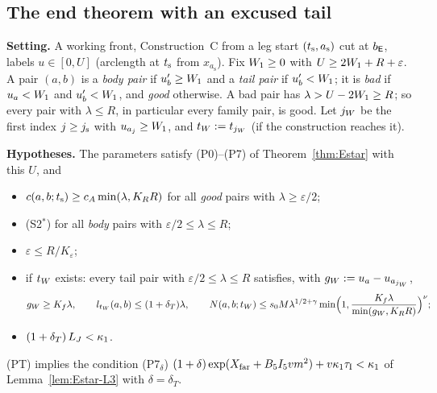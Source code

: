 \subsection{The end theorem with an excused tail}

\noindent\textbf{Setting.} A working front, Construction~C from a leg start $(t_{\mathrm s},a_{\mathrm s})$ cut at $b_{\mathsf E}$, labels
$u\in[0,U]$ (arclength at $t_{\mathrm s}$ from $x_{a_{\mathrm s}}$). Fix $W_1\ge0$ with $U\ge2W_1+R+\varepsilon$. A pair $(a,b)$ is a
\emph{body pair} if $u_b'\ge W_1$ and a \emph{tail pair} if $u_b'<W_1$; it is \emph{bad} if $u_a<W_1$ and $u_b'<W_1$, and
\emph{good} otherwise. A bad pair has $\lambda>U-2W_1\ge R$; so every pair with $\lambda\le R$, in particular every family pair,
is good. Let $j_W$ be the first index $j\ge j_{\mathrm s}$ with $u_{a_j}\ge W_1$, and $t_W:=t_{j_W}$ (if the construction reaches it).

\medskip\noindent\textbf{Hypotheses.} The parameters satisfy (P0)--(P7) of Theorem~\ref{thm:Estar} with this $U$, and
\begin{itemize}
\item[(S1$'$)] $c(a,b;t_{\mathrm s})\ge c_A\min(\lambda,K_RR)$ for all \emph{good} pairs with $\lambda\ge\varepsilon/2$;
\item[(S2$'$)] (S2$^*$) for all \emph{body} pairs with $\varepsilon/2\le\lambda\le R$;
\item[(S3$^*$)] $\varepsilon\le R/K_\varepsilon$;
\item[(TW)] if $t_W$ exists: every tail pair with $\varepsilon/2\le\lambda\le R$ satisfies, with $g_W:=u_a-u_{a_{j_W}}$,
\[
g_W\ge K_f\lambda,\qquad l_{t_W}(a,b)\le(1+\delta_T)\lambda,\qquad
N(a,b;t_W)\le s_0M\lambda^{1/2+\gamma}\min\Bigl(1,\frac{K_f\lambda}{\min(g_W,K_RR)}\Bigr)^{\nu};
\]
\item[(PT)] $(1+\delta_T)\,L_J<\kappa_1$.
\end{itemize}
(PT) implies the condition (P7$_\delta$) $(1+\delta)\exp(X_{\mathrm{far}}+B_5I_5vm^2)+v\kappa_1\tau_{\mathrm I}<\kappa_1$ of
Lemma~\ref{lem:Estar-L3} with $\delta=\delta_T$.

